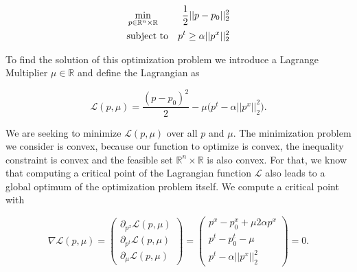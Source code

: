             \begin{eqnarray}
                &\min\limits_{p \in \mathbb{R}^{n} \times \mathbb{R}}& \frac{1}{2} ||p - p_{0}||_{2}^{2} \notag \\
                &\textnormal{subject to}& p^{t} \ge \alpha||p^{x}||_{2}^{2} \notag
            \end{eqnarray}



        To find the solution of this optimization problem we introduce a Lagrange Multiplier $\mu \in \mathbb{R}$ and define the Lagrangian as

        \begin{equation}
            \mathcal{L}(p, \mu) = \frac{(p - p_{0})^{2}}{2} - \mu \bigg( p^{t} - \alpha||p^{x}||_{2}^{2} \bigg).
        \end{equation}

        We are seeking to minimize $\mathcal{L}(p, \mu)$ over all $p$ and $\mu$. The minimization problem we consider is convex, because our function to optimize is convex, the inequality constraint is convex and the feasible set $\mathbb{R}^{n} \times \mathbb{R}$ is also convex. For that, we know that computing a critical point of the Lagrangian function $\mathcal{L}$ also leads to a global optimum of the optimization problem itself. We compute a critical point with

        \begin{equation}
            \nabla \mathcal{L}(p, \mu) =
            \begin{pmatrix}
                \partial_{p^{x}} \mathcal{L}(p, \mu) \\
                \partial_{p^{t}} \mathcal{L}(p, \mu) \\
                \partial_{\mu} \mathcal{L}(p, \mu)
            \end{pmatrix} = 
            \begin{pmatrix}
                p^{x} - p_{0}^{x} + \mu 2 \alpha p^{x} \\
                p^{t} - p_{0}^{t} - \mu \\
                p^{t} - \alpha||p^{x}||_{2}^{2}
            \end{pmatrix}
            = 0. \label{eq:linearSystem}
        \end{equation}

